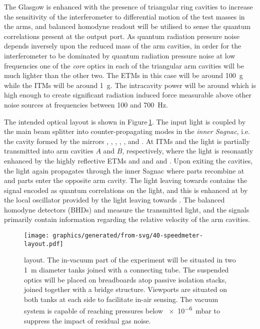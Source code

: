 The Glasgow \SSMEXPT{} is enhanced with the presence of triangular ring cavities to increase the sensitivity of the interferometer to differential motion of the test masses in the arms, and balanced homodyne readout will be utilised to sense the quantum correlations present at the output port. As quantum radiation pressure noise depends inversely upon the reduced mass of the arm cavities, in order for the interferometer to be dominated by quantum radiation pressure noise at low frequencies one of the \emph{core} optics in each of the triangular arm cavities will be much lighter than the other two. The \glspl{ETM} in this case will be around \SI{100}{\gram} while the \glspl{ITM} will be around \SI{1}{\gram}. The intracavity power will be around  which is high enough to create significant radiation induced force measurable above other noise sources at frequencies between \num{100} and \SI{700}{\hertz}.

The intended optical layout is shown in Figure\,\ref{fig:ssm-layout}. The input light is coupled by the main beam splitter \MSIX{} into counter-propagating modes in the \emph{inner Sagnac}, i.e. the cavity formed by the mirrors \MSIX{}, \MSEVEN{}, \MONEA{}, \MTEN{}, \MNINE{}, \MEIGHT{} and \MONEB{}. At \glspl{ITM} \MONEA{} and \MONEB{} the light is partially transmitted into arm cavities $A$ and $B$, respectively, where the light is resonantly enhanced by the highly reflective \glspl{ETM} \MTWOA{} and \MTHREEA{} and \MTWOB{} and \MTHREEB{}. Upon exiting the cavities, the light again propagates through the inner Sagnac where parts recombine at \MSIX{} and parts enter the opposite arm cavity. The light leaving \MSIX{} towards \MFOURTEEN{} contains the signal encoded as quantum correlations on the light, and this is enhanced at \MSIXTEEN{} by the local oscillator provided by the light leaving \MSIX{} towards \MTWELVE{}. The balanced homodyne detectors (\glspl{BHD}) \HDA{} and \HDB{} measure the transmitted light, and the signals primarily contain information regarding the relative velocity of the arm cavities.

\begin{figure}
  \centering
  \texttt{[image: graphics/generated/from-svg/40-speedmeter-layout.pdf]}
  \caption[\SSMEXPT{} layout]{\label{fig:ssm-layout}\SSMEXPT{} layout. The in-vacuum part of the experiment will be situated in two \SI{1}{\meter} diameter tanks joined with a connecting tube. The suspended optics will be placed on breadboards atop passive isolation stacks, joined together with a bridge structure. Viewports are situated on both tanks at each side to facilitate in-air sensing. The vacuum system is capable of reaching pressures below \SI{e-6}{\milli\bar} to suppress the impact of residual gas noise.}
\end{figure}

